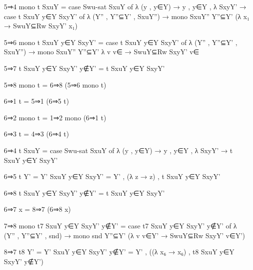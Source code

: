 \begin{spverbatim}
  5⇒4 mono t SxuY = case Swu-sat SxuY of λ { (y , y∈Y) → y , y∈Y ,
    λ {SxyY' → case t SxuY y∈Y SxyY' of λ { (Y'' , Y''⊆Y' , SxuY'') →
    mono SxuY'' Y''⊆Y' (λ x₁ → SwuY⊆Rw SxyY' x₁)}}}

  5⇒6 mono t SxuY y∈Y SxyY' = case t SxuY y∈Y SxyY' of
    λ { (Y'' , Y''⊆Y' , SxuY'') → mono SxuY'' Y''⊆Y' λ { {v} v∈ → SwuY⊆Rw SxyY' v∈}}

  5⇒7 t SxuY y∈Y SxyY' y∉Y' = t SxuY y∈Y SxyY'

  5⇒8 mono t = 6⇒8 (5⇒6 mono t)

  6⇒1 t = 5⇒1 (6⇒5 t)

  6⇒2 mono t = 1⇒2 mono (6⇒1 t)

  6⇒3 t = 4⇒3 (6⇒4 t)

  6⇒4 t SxuY = case Swu-sat SxuY of
    λ { (y , y∈Y) → y , y∈Y , λ {SxyY' → t SxuY y∈Y SxyY'}}

  6⇒5 t {Y' = Y'} SxuY y∈Y SxyY' = Y' , (λ z → z) , t SxuY y∈Y SxyY'

  6⇒8 t SxuY y∈Y SxyY' y∉Y' = t SxuY y∈Y SxyY'

  6⇒7 x = 8⇒7 (6⇒8 x)

  7⇒8 mono t7 SxuY y∈Y SxyY' y∉Y' = case t7 SxuY y∈Y SxyY' y∉Y'
    of λ { (Y'' , Y''⊆Y' , snd) → mono snd Y''⊆Y' (λ {v} v∈Y' → SwuY⊆Rw SxyY' v∈Y')}

  8⇒7 t8 {Y' = Y'} SxuY y∈Y SxyY' y∉Y' = Y' , ((λ x₆ → x₆) , t8 SxuY y∈Y SxyY' y∉Y')
\end{spverbatim}
